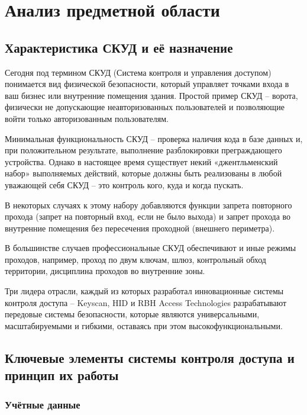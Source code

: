 \section{Анализ предметной области}
\subsection{Характеристика СКУД и её назначение}

Сегодня под термином СКУД (Система контроля и управления доступом) понимается вид физической безопасности, который управляет точками входа в ваш бизнес или внутренние помещения здания. Простой пример СКУД -- ворота, физически не допускающие неавторизованных пользователей и позволяющие войти только авторизованным пользователям.

Минимальная функциональность СКУД – проверка наличия кода в базе данных и, при положительном результате, выполнение разблокировки преграждающего устройства. Однако в настоящее время существует некий «джентльменский набор» выполняемых действий, которые должны быть реализованы в любой уважающей себя СКУД – это контроль кого, куда и когда пускать.

В некоторых случаях к этому набору добавляются функции запрета повторного прохода (запрет на повторный вход, если не было выхода) и запрет прохода во внутренние помещения без пересечения проходной (внешнего периметра).

В большинстве случаев профессиональные СКУД обеспечивают и иные режимы проходов, например, проход по двум ключам,  шлюз, контрольный обход территории, дисциплина проходов во внутренние зоны.

Три лидера отрасли, каждый из которых разработал инновационные системы контроля доступа -- Keyscan, HID и RBH Access Technologies разрабатывают передовые системы безопасности, которые являются универсальными, масштабируемыми и гибкими, оставаясь при этом высокофункциональными.



\subsection{Ключевые элементы системы контроля доступа и принцип их работы}
\subsubsection{Учётные данные}

